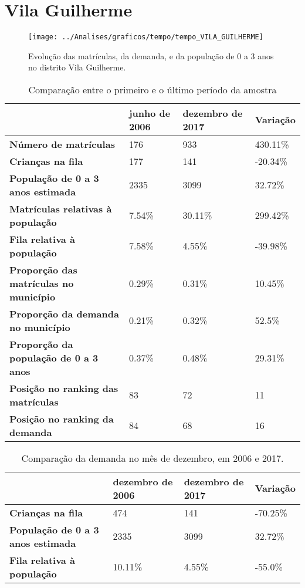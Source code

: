 \section{Vila Guilherme}
\begin{figure}[H]
\centering
\texttt{[image: ../Analises/graficos/tempo/tempo\_VILA\_GUILHERME]}
\caption{Evolução das matrículas, da demanda, e da população de 0 a 3 anos no distrito Vila Guilherme.}
\end{figure}
\begin{table}[H]
\begin{tabular}{|l|l|l|l|}
\hline
\textbf{}                                      & \textbf{junho de 2006}       & \textbf{dezembro de 2017}    & \textbf{Variação} \\ \hline
\textbf{Número de matrículas}                  & 176 & 933 & 430.11\% \\ \hline
\textbf{Crianças na fila}                      & 177 & 141 & -20.34\% \\ \hline
\textbf{População de 0 a 3 anos estimada}      & 2335 & 3099 & 32.72\% \\ \hline
\textbf{Matrículas relativas à população}      & 7.54\% & 30.11\% & 299.42\% \\ \hline
\textbf{Fila relativa à população}             & 7.58\% & 4.55\% & -39.98\% \\ \hline
\textbf{Proporção das matrículas no município} & 0.29\% & 0.31\% & 10.45\% \\ \hline
\textbf{Proporção da demanda no município}     & 0.21\% & 0.32\% & 52.5\% \\ \hline
\textbf{Proporção da população de 0 a 3 anos}  & 0.37\% & 0.48\% & 29.31\% \\ \hline
\textbf{Posição no ranking das matrículas}     & 83 & 72 & 11 \\ \hline
\textbf{Posição no ranking da demanda}         & 84 & 68 & 16 \\ \hline
\end{tabular}
\caption{Comparação entre o primeiro e o último período da amostra}
\end{table}
\begin{table}[H]
\begin{tabular}{|l|l|l|l|}
\hline
\textbf{}                                 & \textbf{dezembro de 2006} & \textbf{dezembro de 2017} & \textbf{Variação} \\ \hline
\textbf{Crianças na fila}                      & 474 & 141 & -70.25\% \\ \hline
\textbf{População de 0 a 3 anos estimada}      & 2335 & 3099 & 32.72\% \\ \hline
\textbf{Fila relativa à população}             & 10.11\% & 4.55\% & -55.0\% \\ \hline
\end{tabular}
\caption{Comparação da demanda no mês de dezembro, em 2006 e 2017.}
\end{table}
